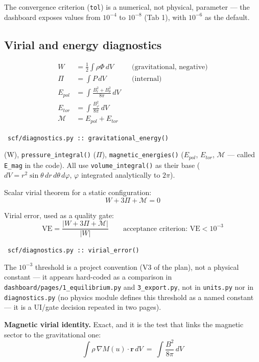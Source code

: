 \documentclass[11pt,a4paper]{scrartcl}
\newcommand{\arrowto}[1]{%
  \par\vspace{2pt}\noindent{\color{linkblue}$\rightarrow$}~\texttt{\small #1}\par\vspace{2pt}}
\newcommand{\code}[1]{\texttt{\small #1}}
\begin{document}
The convergence criterion (\code{tol}) is a numerical, not physical,
parameter --- the dashboard exposes values from $10^{-4}$ to $10^{-8}$
(Tab 1), with $10^{-6}$ as the default.

\subsection{Virial and energy diagnostics}
\label{sec:virial}

\begin{align}
W &= \tfrac{1}{2}\int \rho\Phi\,dV & &\text{(gravitational, negative)}\\
\Pi &= \int P\,dV & &\text{(internal)}\\
E_{pol} &= \int \frac{B_r^2+B_\theta^2}{8\pi}\,dV\\
E_{tor} &= \int \frac{B_\varphi^2}{8\pi}\,dV\\
\mathcal{M} &= E_{pol} + E_{tor}
\end{align}

\arrowto{scf/diagnostics.py :: gravitational\_energy()} (W), \code{pressure\_integral()} ($\Pi$), \code{magnetic\_energies()} ($E_{pol}$, $E_{tor}$, $\mathcal{M}$ --- called \code{E\_mag} in the code). All use \code{volume\_integral()} as their base ($dV=r^2\sin\theta\,dr\,d\theta\,d\varphi$, $\varphi$ integrated analytically to $2\pi$).

Scalar virial theorem for a static configuration:
\begin{equation}
W + 3\Pi + \mathcal{M} = 0
\end{equation}

Virial error, used as a quality gate:
\begin{equation}
\mathrm{VE} = \frac{|W+3\Pi+\mathcal{M}|}{|W|} \qquad \text{acceptance criterion: } \mathrm{VE}<10^{-3}
\end{equation}

\arrowto{scf/diagnostics.py :: virial\_error()} The $10^{-3}$ threshold is a project convention (V3 of the plan), not a physical constant --- it appears hard-coded as a comparison in \code{dashboard/pages/1\_equilibrium.py} and \code{3\_export.py}, not in \code{units.py} nor in \code{diagnostics.py} (no physics module defines this threshold as a named constant --- it is a UI/gate decision repeated in two pages).

\textbf{Magnetic virial identity.} Exact, and it is the test that links
the magnetic sector to the gravitational one:
\begin{equation}
\int \rho\,\nabla M(u)\cdot\mathbf{r}\,dV \ =\ \int \frac{B^2}{8\pi}\,dV
\end{equation}
\end{document}
